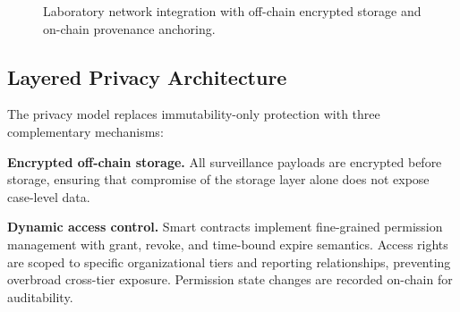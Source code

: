 \documentclass[AMA,LATO1COL]{WileyNJD-v2}
\begin{document}
\begin{figure}[!ht]
\centering
{}
\caption{Laboratory network integration with off-chain encrypted storage and on-chain provenance anchoring.}\label{fig:laboratory}
\end{figure}

%
%
%
%
%
%

\subsection{Layered Privacy Architecture}\label{subsec:privacy}

The privacy model replaces immutability-only protection with three complementary mechanisms:

\textbf{Encrypted off-chain storage.} All surveillance payloads are encrypted before storage, ensuring that compromise of the storage layer alone does not expose case-level data.

\textbf{Dynamic access control.} Smart contracts implement fine-grained permission management with grant, revoke, and time-bound expire semantics. Access rights are scoped to specific organizational tiers and reporting relationships, preventing overbroad cross-tier exposure. Permission state changes are recorded on-chain for auditability.
\end{document}
